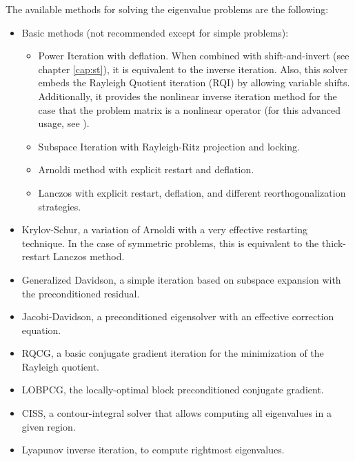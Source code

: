 The available methods for solving the eigenvalue problems are the following:
\begin{itemize}
\setlength{\itemsep}{0pt}
\item Basic methods (not recommended except for simple problems):
\begin{itemize}
\setlength{\itemsep}{-1pt}
\item Power Iteration with deflation. When combined with shift-and-invert (see chapter \ref{cap:st}), it is equivalent to the inverse iteration. Also, this solver embeds the Rayleigh Quotient iteration (RQI) by allowing variable shifts. Additionally, it provides the nonlinear inverse iteration method for the case that the problem matrix is a nonlinear operator (for this advanced usage, see ).
\item Subspace Iteration with Rayleigh-Ritz projection and locking.
\item Arnoldi method with explicit restart and deflation.
\item Lanczos with explicit restart, deflation, and different reorthogonalization strategies.
\end{itemize}
\item Krylov-Schur, a variation of Arnoldi with a very effective restarting technique. In the case of symmetric problems, this is equivalent to the thick-restart Lanczos method.
\item Generalized Davidson, a simple iteration based on subspace expansion with the preconditioned residual.
\item Jacobi-Davidson, a preconditioned eigensolver with an effective correction equation.
\item RQCG, a basic conjugate gradient iteration for the minimization of the Rayleigh quotient.
\item LOBPCG, the locally-optimal block preconditioned conjugate gradient.
\item CISS, a contour-integral solver that allows computing all eigenvalues in a given region.
\item Lyapunov inverse iteration, to compute rightmost eigenvalues.
\end{itemize}


